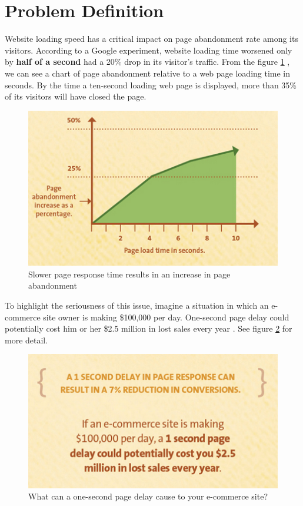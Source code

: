 \section{Problem Definition}

Website loading speed has a critical impact on page abandonment rate among its visitors. According to a Google experiment, website loading time worsened only by \textbf{half of a second} had a 20\% drop in its visitor’s traffic. \cite{KISSmetrics:Speed-Google} From the figure \ref{fig:kissmetrics-page-abandonment} \cite{Fig:Kissmetrics-page-abandonment}, we can see a chart of page abandonment relative to a web page loading time in seconds. By the time a ten-second loading web page is displayed, more than 35\% of its visitors will have closed the page.

\begin{figure}[H]
\begin{center}
\includegraphics[scale=0.5]{figures/page-abandonment-chart.png}
\caption{Slower page response time results in an increase in page abandonment}
\label{fig:kissmetrics-page-abandonment}
\end{center}
\end{figure}

To highlight the seriousness of this issue, imagine a situation in which an e-commerce site owner is making \$100,000 per day. One-second page delay could potentially cost him or her \$2.5 million in lost sales every year \cite{Fig:Kissmetrics-page-abandonment}. See figure \ref{fig:kissmetrics-eshop-delay} for more detail.

\begin{figure}[H]
\begin{center}
\includegraphics[scale=0.5]{figures/kissmetrics-eshop-delay.png}
\caption{What can a one-second page delay cause to your e-commerce site?}
\label{fig:kissmetrics-eshop-delay}
\end{center}
\end{figure}

